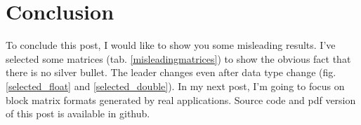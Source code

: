 \documentclass{article}
\begin{document}
\begin{figure}[H]
\centering
{}
\qquad %
\end{figure}




\section{Conclusion}
To conclude this post, I would like to show you some misleading results. I've selected some matrices (tab. \ref{misleadingmatrices}) to show the obvious fact that there is no silver bullet.
The leader changes even after data type change (fig. \ref{selected_float} and \ref{selected_double}). In my next post, I'm going to focus on block matrix formats generated by real applications.
Source code and pdf version of this post is available in github.
\end{document}
